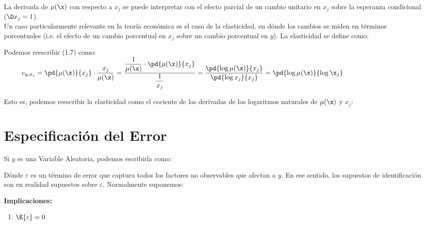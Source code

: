 \bigskip
La derivada de $\mu(\x)$ con respecto a $x_j$ se puede interpretar con el efecto parcial de un cambio unitario en $x_j$ sobre la esperanza condicional ($\D x_j=1$). \\

Un caso particularmente relevante en la teoría económica es el caso de la elasticidad, en dónde los cambios se miden en términos porcentuales (i.e. el efecto de un cambio porcentual en $x_j$ sobre un cambio porcentual en $y$). La elasticidad se define como:

\bigskip
Podemos reescribir (1.7) como: \\

$\begin{array}{llllll}
    & &  e_{y,x_j} = \pd{ \mu(\x) }{ x_j } \cdot \dfrac{ x_j }{ \mu(\x) } = 
    \dfrac{ \dfrac{ 1 }{ \mu(\x) } \cdot \pd{ \mu(\x) }{ x_j } }{ \dfrac{ 1 }{ x_j } } = \dfrac{ \pd{ \log \mu(\x) }{ x_j } }{ \pd{ \log x_j }{ x_j } } = \pd{ \log \mu(\x) }{ \log \x_j }
\end{array}$

\bigskip
Esto es, podemos reescribir la elasticidad como el cociente de las derivadas de los logaritmos naturales de $\mu(\x)$ y $x_j$:


\section{Especificación del Error}

Si $y$ es una Variable Aleatoria, podemos escribirla como:

\bigskip
Dónde $\varepsilon$ es un término de error que captura todos los factores no observables que afectan a $y$. En ese sentido, los supuestos de identificación son en realidad supuestos sobre $\varepsilon$. Normalmente suponemos:

\bigskip
\textbf{Implicaciones:}

\begin{enumerate}
    \item $\E{\varepsilon}=0$
\end{enumerate}


